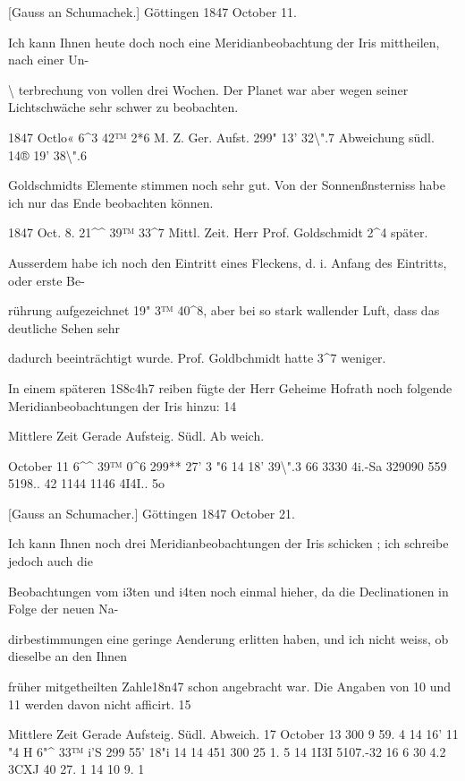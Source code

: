 \documentclass[10pt,a4paper]{article}
\begin{document}
[Gauss an Schumachek.] Göttingen 1847 October 11.

Ich kann Ihnen heute doch noch eine Meridianbeobachtung der Iris mittheilen, nach einer Un-

\textbackslash{} terbrechung von vollen drei Wochen. Der Planet war aber wegen seiner Lichtschwäche sehr schwer zu beobachten.

1847 Octlo« 6\textasciicircum{}3 42™ 2*6 M. Z. Ger. Aufst. 299" 13' 32\textbackslash{}".7 Abweichung südl. 14® 19' 38\textbackslash{}".6

Goldschmidts Elemente stimmen noch sehr gut. Von der Sonnenßnsterniss habe ich nur das Ende beobachten können.

1847 Oct. 8. 21\textasciicircum{}\textasciicircum{} 39™ 33\textasciicircum{}7 Mittl. Zeit. Herr Prof. Goldschmidt 2\textasciicircum{}4 später.

Ausserdem habe ich noch den Eintritt eines Fleckens, d. i. Anfang des Eintritts, oder erste Be-

rührung aufgezeichnet 19" 3™ 40\textasciicircum{}8, aber bei so stark wallender Luft, dass das deutliche Sehen sehr

dadurch beeinträchtigt wurde. Prof. Goldbchmidt hatte 3\textasciicircum{}7 weniger.

In einem späteren 1S8c4h7 reiben fügte der Herr Geheime Hofrath noch folgende Meridianbeobachtungen der Iris hinzu: 14

Mittlere Zeit Gerade Aufsteig. Südl. Ab weich.

October 11 6\textasciicircum{}\textasciicircum{} 39™ 0\textasciicircum{}6 299** 27' 3 "6 14\textdegree{} 18' 39\textbackslash{}".3 66 3330 4i.-Sa 329090 559 5198.. 42 1144 1146 4I4I.. 5o

[Gauss an Schumacher.] Göttingen 1847 October 21.

Ich kann Ihnen noch drei Meridianbeobachtungen der Iris schicken ; ich schreibe jedoch auch die

Beobachtungen vom i3ten und i4ten noch einmal hieher, da die Declinationen in Folge der neuen Na-

dirbestimmungen eine geringe Aenderung erlitten haben, und ich nicht weiss, ob dieselbe an den Ihnen

früher mitgetheilten Zahle18n47 schon angebracht war. Die Angaben von 10 und 11 werden davon nicht afficirt. 15

Mittlere Zeit Gerade Aufsteig. Südl. Abweich. 17 October 13 300 9 59. 4 14\textdegree{} 16' 11 "4 H 6"\textasciicircum{} 33™ i'S 299\textdegree{} 55' 18"i 14 14 451 300 25 1. 5 14 1I3I 5107.-32 16 6 30 4.2 3CXJ 40 27. 1 14 10 9. 1
\end{document}
